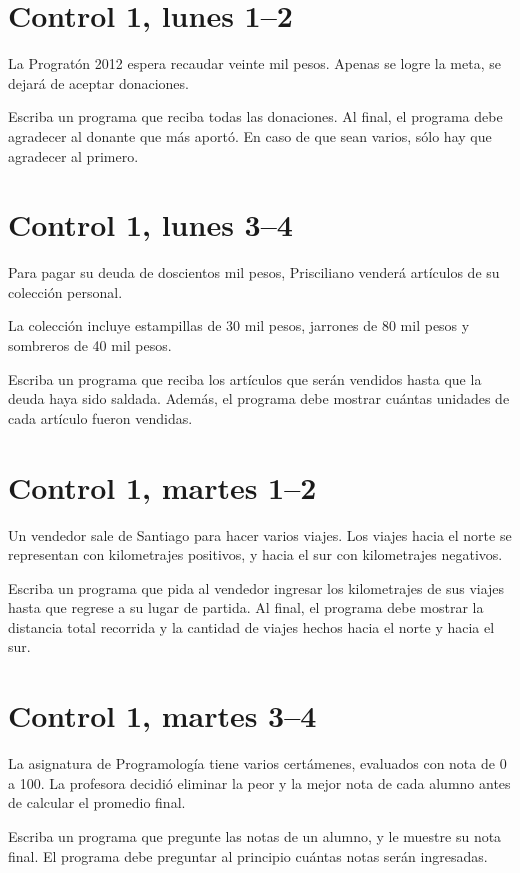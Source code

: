 \documentclass[12pt,spanish,a5paper,landscape]{article}
\begin{document}
  \pagestyle{empty}
  \thispagestyle{empty}

  \part*{Control 1, lunes 1--2}
  \newpage

  La Progratón 2012 espera recaudar veinte mil pesos.
  Apenas se logre la meta,
  se dejará de aceptar donaciones.

  Escriba un programa que reciba todas las donaciones.
  Al final,
  el programa debe agradecer
  al donante que más aportó.
  En caso de que sean varios,
  sólo hay que agradecer al primero.

  

  \newpage
  \part*{Control 1, lunes 3--4}
  \newpage

  Para pagar su deuda de doscientos mil pesos,
  Prisciliano venderá artículos de su colección personal.

  La colección incluye
  estampillas de 30 mil pesos,
  jarrones de 80 mil pesos y
  sombreros de 40 mil pesos.

  Escriba un programa
  que reciba los artículos que serán vendidos
  hasta que la deuda haya sido saldada.
  Además,
  el programa debe mostrar
  cuántas unidades de cada artículo
  fueron vendidas.

  

  \newpage
  \part*{Control 1, martes 1--2}
  \newpage

  Un vendedor sale de Santiago
  para hacer varios viajes.
  Los viajes hacia el norte
  se representan con kilometrajes positivos,
  y hacia el sur con kilometrajes negativos.

  Escriba un programa que pida al vendedor
  ingresar los kilometrajes de sus via\-jes
  hasta que regrese a su lugar de partida.
  Al final,
  el programa debe mostrar
  la distancia total recorrida
  y la cantidad de viajes hechos
  hacia el norte y hacia el sur.

  

  \newpage
  \part*{Control 1, martes 3--4}
  \newpage

  La asignatura de Programología
  tiene varios certámenes,
  evaluados con nota de 0 a 100.
  La profesora decidió eliminar
  la peor y la mejor nota de cada alumno
  antes de calcular el promedio final.

  Escriba un programa que pregunte
  las notas de un alumno,
  y le muestre su nota final.
  El programa debe preguntar al principio
  cuántas notas serán ingresadas.

  
\end{document}
